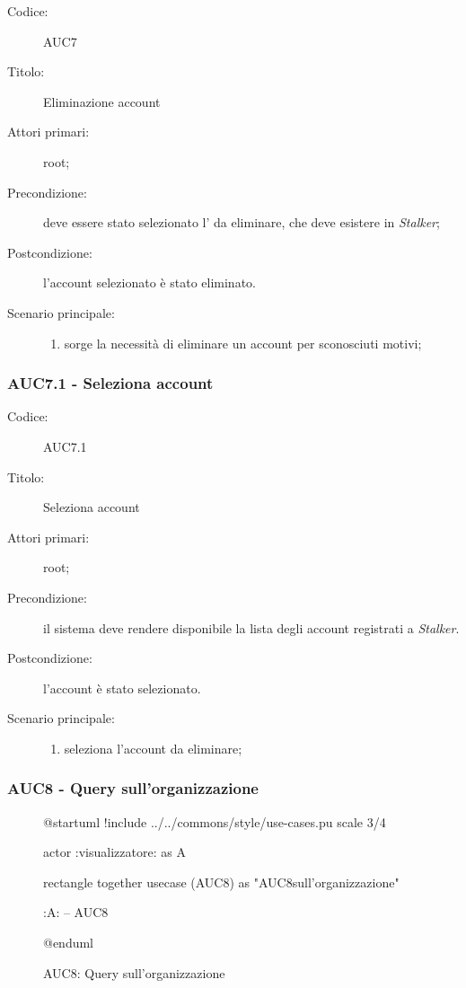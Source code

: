 \documentclass[casi-duso]{subfiles}
\begin{document}
\begin{description}
  \item[Codice:] AUC7
  \item[Titolo:] Eliminazione account
  \item[Attori primari:] root;
  \item[Precondizione:] deve essere stato selezionato l' da eliminare, che deve esistere in \emph{Stalker};
  \item[Postcondizione:] l'account selezionato è stato eliminato.
  \item[Scenario principale:]
  \begin{enumerate}
    \item sorge la necessità di eliminare un account per sconosciuti motivi;
  \end{enumerate}
\end{description}

\subsubsection{AUC7.1 - Seleziona account}%
\label{subsub:AUC7.1}
\begin{description}
  \item[Codice:] AUC7.1
  \item[Titolo:] Seleziona account
  \item[Attori primari:] root;
  \item[Precondizione:] il sistema deve rendere disponibile la lista degli account registrati a \emph{Stalker}.
  \item[Postcondizione:] l'account è stato selezionato.
  \item[Scenario principale:]
  \begin{enumerate}
    \item {} seleziona l'account da eliminare;
  \end{enumerate}
\end{description}

\subsubsection{AUC8 - Query sull'organizzazione}%
\label{subsub:AUC8}

\begin{figure}[h!]
  \centering
  \begin{plantuml}
  @startuml
  !include ../../commons/style/use-cases.pu
  scale 3/4

  actor :visualizzatore: as A

  rectangle {
    together {
      usecase (AUC8) as "AUC8\nQuery sull'organizzazione"
    }
  }

  :A: -- AUC8

  @enduml
  \end{plantuml}
  \caption{AUC8: Query sull'organizzazione}
  \label{fig:auc8}
\end{figure}
\end{document}
